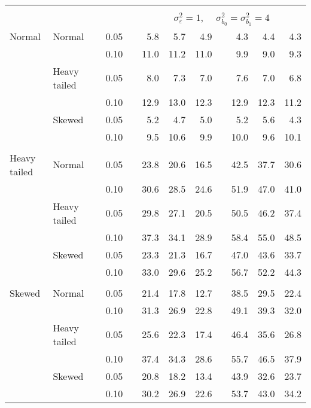 \begin{table}[ht]
\begin{scriptsize}
\begin{center}
\begin{tabular}{ll p{.1cm} c p{.1cm} rrr p{.1cm} rrr}
&&&&&&&&&&&\\
& && && \multicolumn{7}{c}{$\sigma_{\varepsilon}^2 = 1$, \ \ $\sigma_{b_0}^2 = \sigma_{b_1}^2 = 4$} \\ \cline{6-12}
\rowcolor{gray!20}Normal       & Normal       && 0.05 &&   5.8 & 5.7 & 4.9 &   & 4.3 & 4.4 & 4.3 \\ 
\rowcolor{gray!20}             &              && 0.10 &&   11.0 & 11.2 & 11.0 &   & 9.9 & 9.0 & 9.3 \\ 
\rowcolor{gray!20}             & Heavy tailed && 0.05 &&   8.0 & 7.3 & 7.0 &   & 7.6 & 7.0 & 6.8 \\ 
\rowcolor{gray!20}             &              && 0.10 &&   12.9 & 13.0 & 12.3 &   & 12.9 & 12.3 & 11.2 \\ 
\rowcolor{gray!20}             & Skewed       && 0.05 &&   5.2 & 4.7 & 5.0 &   & 5.2 & 5.6 & 4.3 \\ 
\rowcolor{gray!20}             &              && 0.10 &&   9.5 & 10.6 & 9.9 &   & 10.0 & 9.6 & 10.1 \\ 
&&&&&&&&&&&\\
Heavy tailed & Normal       && 0.05 &&   23.8 & 20.6 & 16.5 &   & 42.5 & 37.7 & 30.6 \\ 
             &              && 0.10 &&   30.6 & 28.5 & 24.6 &   & 51.9 & 47.0 & 41.0 \\ 
             & Heavy tailed && 0.05 &&   29.8 & 27.1 & 20.5 &   & 50.5 & 46.2 & 37.4 \\ 
             &              && 0.10 &&   37.3 & 34.1 & 28.9 &   & 58.4 & 55.0 & 48.5 \\ 
             & Skewed       && 0.05 &&   23.3 & 21.3 & 16.7 &   & 47.0 & 43.6 & 33.7 \\ 
             &              && 0.10 &&   33.0 & 29.6 & 25.2 &   & 56.7 & 52.2 & 44.3 \\ 
&&&&&&&&&&&\\
Skewed       & Normal       && 0.05 &&   21.4 & 17.8 & 12.7 &   & 38.5 & 29.5 & 22.4 \\ 
             &              && 0.10 &&   31.3 & 26.9 & 22.8 &   & 49.1 & 39.3 & 32.0 \\ 
             & Heavy tailed && 0.05 &&   25.6 & 22.3 & 17.4 &   & 46.4 & 35.6 & 26.8 \\ 
             &              && 0.10 &&   37.4 & 34.3 & 28.6 &   & 55.7 & 46.5 & 37.9 \\ 
             & Skewed       && 0.05 &&   20.8 & 18.2 & 13.4 &   & 43.9 & 32.6 & 23.7 \\ 
             &              && 0.10 &&   30.2 & 26.9 & 22.6 &   & 53.7 & 43.0 & 34.2 \\ 

\hline
\end{tabular}
\end{center}
\end{scriptsize}
\end{table}



